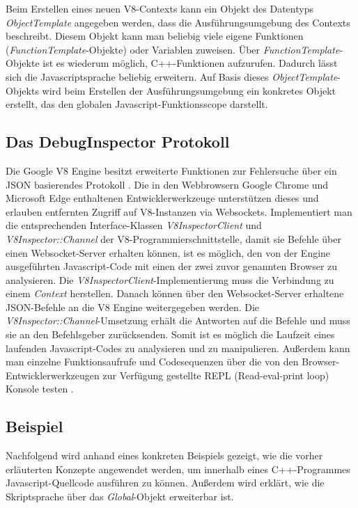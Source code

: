 Beim Erstellen eines neuen V8-Contexts kann ein Objekt des Datentyps \textit{ObjectTemplate} angegeben werden, dass die Ausführungsumgebung des Contexts beschreibt.
Diesem Objekt kann man beliebig viele eigene Funktionen (\textit{FunctionTemplate}-Objekte) oder Variablen zuweisen. Über \textit{FunctionTemplate}-Objekte ist es wiederum möglich, C++-Funktionen aufzurufen. 
Dadurch lässt sich die Javascriptsprache beliebig erweitern. Auf Basis dieses \textit{ObjectTemplate}-Objekts wird beim Erstellen der Ausführungsumgebung ein konkretes Objekt erstellt, das den globalen 
Javascript-Funktionsscope darstellt.

\subsection{Das DebugInspector Protokoll}

Die Google V8 Engine besitzt erweiterte Funktionen zur Fehlersuche über ein JSON basierendes Protokoll \cite{v8Debug}. Die in den Webbrowsern Google Chrome und Microsoft
Edge enthaltenen Entwicklerwerkzeuge unterstützen dieses und erlauben entfernten Zugriff auf V8-Instanzen via Websockets. 
Implementiert man die entsprechenden Interface-Klassen \textit{V8InspectorClient} und \textit{V8Inspector::Channel}
der V8-Programmierschnittstelle, damit sie Befehle über einen Websocket-Server erhalten können, ist es möglich, den von der Engine ausgeführten Javascript-Code mit 
einen der zwei zuvor genannten Browser zu analysieren. Die \textit{V8InspectorClient}-Implementierung muss die Verbindung zu einem \textit{Context} herstellen.
Danach können über den Websocket-Server erhaltene JSON-Befehle an die V8 Engine weitergegeben werden. Die \textit{V8Inspector::Channel}-Umsetzung 
erhält die Antworten auf die Befehle und muss sie an den Befehlsgeber zurücksenden. Somit ist es möglich die Laufzeit eines laufenden Javascript-Codes zu 
analysieren und zu manipulieren. Außerdem kann man einzelne Funktionsaufrufe und Codesequenzen über die von den Browser-Entwicklerwerkzeugen zur Verfügung gestellte REPL (Read-eval-print loop) 
Konsole testen \cite{repl}.

\subsection{Beispiel}
\label{cha:v8_code}

Nachfolgend wird anhand eines konkreten Beispiels gezeigt, wie die vorher erläuterten Konzepte angewendet werden, um innerhalb eines
C++-Programmes Javascript-Quellcode ausführen zu können. Außerdem wird erklärt, wie die Skriptsprache über das \textit{Global}-Objekt erweiterbar 
ist.

